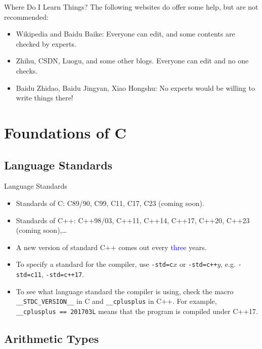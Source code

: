 \documentclass[handout]{beamer}
\newcommand{\blue}[1]{\textcolor{blue}{#1}}
\begin{document}
\begin{frame}{Where Do I Learn Things?}
    The following websites do offer some help, but are not recommended:
    \begin{itemize}
        \item Wikipedia and Baidu Baike: Everyone can edit, and some contents are checked by experts.
        \item Zhihu, CSDN, Luogu, and some other blogs. Everyone can edit and no one checks.
        \item Baidu Zhidao, Baidu Jingyan, Xiao Hongshu: No experts would be willing to write things there!
    \end{itemize}
\end{frame}

\section{Foundations of C}

\subsection{Language Standards}

\begin{frame}{Language Standards}
    \begin{itemize}
        \item Standards of C: C89/90, C99, C11, C17, C23 (coming soon).
        \item Standards of C++: C++98/03, C++11, C++14, C++17, C++20, C++23 (coming soon),\dots
        \pause
        \item A new version of standard C++ comes out every \blue{three} years.
        \pause
        \item To specify a standard for the compiler, use \texttt{-std=c}\(x\) or \texttt{-std=c++}\(y\), e.g. \texttt{-std=c11}, \texttt{-std=c++17}.
        \pause
        \item To see what language standard the compiler is using, check the macro \texttt{\_\_STDC\_VERSION\_\_} in C and \texttt{\_\_cplusplus} in C++. For example, \texttt{\_\_cplusplus == 201703L} means that the program is compiled under C++17.
    \end{itemize}
\end{frame}

\subsection{Arithmetic Types}
\end{document}
